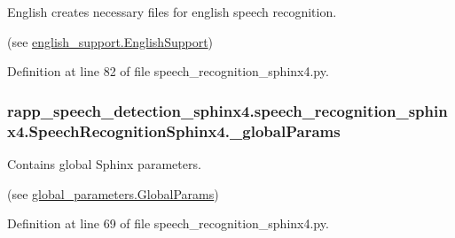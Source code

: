 English creates necessary files for english speech recognition. 

(see \hyperlink{classrapp__speech__detection__sphinx4_1_1english__support_1_1EnglishSupport}{english\-\_\-support.\-English\-Support}) 

Definition at line 82 of file speech\-\_\-recognition\-\_\-sphinx4.\-py.

\hypertarget{classrapp__speech__detection__sphinx4_1_1speech__recognition__sphinx4_1_1SpeechRecognitionSphinx4_a530d829504b888823d2e72dafc3ba36c}{
\subsubsection[{\-\_\-global\-Params}]{\setlength{\rightskip}{0pt plus 5cm}rapp\-\_\-speech\-\_\-detection\-\_\-sphinx4.\-speech\-\_\-recognition\-\_\-sphinx4.\-Speech\-Recognition\-Sphinx4.\-\_\-global\-Params\hspace{0.3cm}{\ttfamily [private]}}}\label{classrapp__speech__detection__sphinx4_1_1speech__recognition__sphinx4_1_1SpeechRecognitionSphinx4_a530d829504b888823d2e72dafc3ba36c}


Contains global Sphinx parameters. 

(see \hyperlink{classrapp__speech__detection__sphinx4_1_1global__parameters_1_1GlobalParams}{global\-\_\-parameters.\-Global\-Params}) 

Definition at line 69 of file speech\-\_\-recognition\-\_\-sphinx4.\-py.

